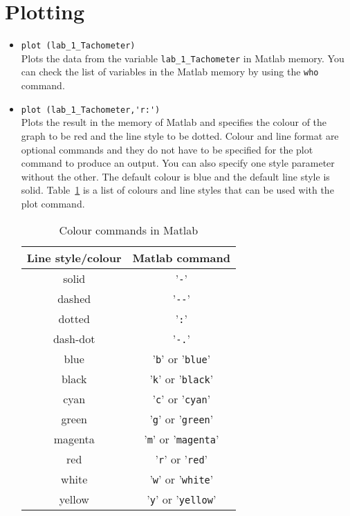 \section{Plotting}

\begin{itemize}
    \item \verb|plot (lab_1_Tachometer)|\\
          Plots the data from the variable \verb|lab_1_Tachometer| in \textsf{Matlab} memory.
          You can check the list of variables in the \textsf{Matlab} memory by using the
          \verb|who| command.

    \item \verb|plot (lab_1_Tachometer,'r:')|\\
          Plots the result in the memory of \textsf{Matlab} and specifies the colour of
          the graph to be red and the line style to be dotted.  Colour and line format
          are optional commands and they do not have to be specified for the plot
          command to produce an output. You can also specify one style parameter
          without the other.  The default colour is blue and the default line style is
          solid.  Table~\ref{tab:colour} is a list of colours and line styles that can
          be used with the plot command.
          \begin{table}[htbp]
              \centering
              \begin{tabular}{c c}
                  Line style/colour & \textsf{Matlab} command                                \\\toprule
                  solid             & '\verb|-|'                              \\
                  dashed            & '\verb|--|'                              \\
                  dotted            & '\verb|:|'                              \\
                  dash-dot          & '\verb|-.|'                              \\
                  blue              & '\verb|b|' or '\verb|blue|' \\
                  black             & '\verb|k|' or '\verb|black|' \\
                  cyan              & '\verb|c|' or '\verb|cyan|' \\
                  green             & '\verb|g|' or '\verb|green|' \\
                  magenta           & '\verb|m|' or '\verb|magenta|' \\
                  red               & '\verb|r|' or '\verb|red|' \\
                  white             & '\verb|w|' or '\verb|white|' \\
                  yellow            & '\verb|y|' or '\verb|yellow|' \\
              \end{tabular}
              \caption{Colour commands in \textsf{Matlab}}\label{tab:colour}
          \end{table}


\end{itemize}
